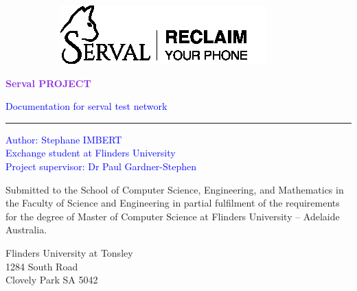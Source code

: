 \begin{titlepage}

		\begin{figure}[t]

			\begin{subfigure}{0.5\textwidth}
			\includegraphics[width=0.9\linewidth, left]{image/serval-logo-2-black.png}
			\end{subfigure}
		\end{figure}

    \begin{center}
        \vspace*{2cm}
				
        \Huge
        \textbf{\textcolor{BlueViolet}{Serval PROJECT}}
        
        \vspace{0.5cm}
        \LARGE
				\textcolor{blue}{Documentation for serval test network}
				\noindent\color{BlueViolet}\rule{\textwidth}{2pt}
		\end{center}        
		\vspace{1.5cm}
		
		\vfill
		
		\noindent\textcolor{Blue}{
		\large \noindent Author: Stephane IMBERT\\
		Exchange student at Flinders University\\
		Project supervisor: Dr Paul Gardner-Stephen
		}
		
		\vspace{2cm}	
		
		\noindent\large Submitted to the School of Computer Science, Engineering, and Mathematics in the Faculty 
of Science and Engineering in partial fulfilment of the requirements for the degree of Master of Computer Science at Flinders University –
 Adelaide Australia.
		
		\vspace{1.5cm}
		\noindent\large
		Flinders University at Tonsley\\
		1284 South Road\\
		Clovely Park SA 5042
\end{titlepage}